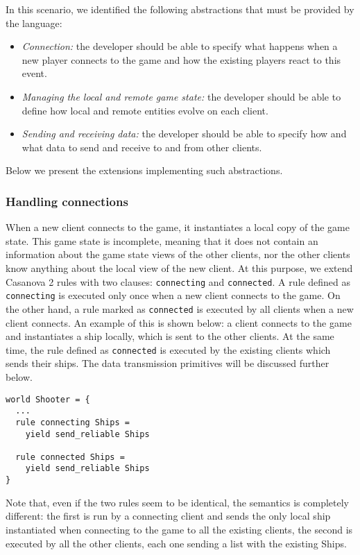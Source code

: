 In this scenario, we identified the following abstractions that must be provided by the language:

\begin{itemize}
	\item \textit{Connection:} the developer should be able to specify what happens when a new player connects to the game and how the existing players react to this event.
	\item \textit{Managing the local and remote game state:} the developer should be able to define how local and remote entities evolve on each client.
	\item \textit{Sending and receiving data:} the developer should be able to specify how and what data to send and receive to and from other clients.
\end{itemize}

Below we present the extensions implementing such abstractions.

\subsubsection{Handling connections}
When a new client connects to the game, it instantiates a local copy of the game state. This game state is incomplete, meaning that it does not contain an information about the game state views of the other clients, nor the other clients know anything about the local view of the new client. At this purpose, we extend Casanova 2 rules with two clauses: \texttt{connecting} and \texttt{connected}. A rule defined as \texttt{connecting} is executed only once when a new client connects to the game. On the other hand, a rule marked as \texttt{connected} is executed by all clients when a new client connects. An example of this is shown below: a client connects to the game and instantiates a ship locally, which is sent to the other clients. At the same time, the rule defined as \texttt{connected} is executed by the existing clients which sends their ships. The data transmission primitives will be discussed further below.

\begin{lstlisting}
world Shooter = {
  ...
  rule connecting Ships =
    yield send_reliable Ships
    
  rule connected Ships =
    yield send_reliable Ships
}
\end{lstlisting}

\noindent
Note that, even if the two rules seem to be identical, the semantics is completely different: the first is run by a connecting client and sends the only local ship instantiated when connecting to the game to all the existing clients, the second is executed by all the other clients, each one sending a list with the existing Ships.

